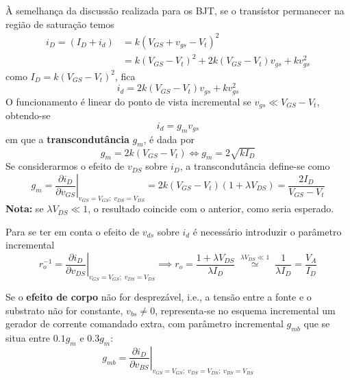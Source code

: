 À semelhança da discussão realizada para os BJT, se o transístor permanecer na região de saturação temos
$$
    \begin{aligned}
        i_D = (I_D + i_d) &= k(V_{GS} + v_{gs} - V_t)^2\\
        &= k(V_{GS} - V_t)^2 + 2k(V_{GS} - V_t) v_{gs} + k v^2_{gs}
    \end{aligned}
$$
\noindent como $I_D = k(V_{GS} - V_t)^2$, fica
$$
    i_d = 2k (V_{GS} - V_t)v_{gs} + k v^2_{gs}
$$
O funcionamento é linear do ponto de vista incremental se $v_{gs} \ll V_{GS} - V_t$, obtendo-se
$$
    i_d = g_m v_{gs}
$$
em que a \textbf{transcondutância} $g_m$, é dada por
$$
    g_m = 2k(V_{GS} - V_t) \iff g_m = 2\sqrt{k I_D}
$$
Se considerarmos o efeito de $v_{DS}$ sobre $i_D$, a transcondutância define-se como
$$
    g_m = \left.\frac{\partial i_D}{\partial v_{GS}}\right|_{v_{GS} = V_{GS};\; v_{DS} = V_{DS}} = 2k(V_{GS} - V_t)(1 + \lambda V_{DS}) = \frac{2 I_D}{V_{GS} - V_t}
$$
\noindent \textbf{Nota:} se $\lambda V_{DS} \ll 1$, o resultado coincide com o anterior, como seria esperado.

\vspace{0.5em}
\noindent Para se ter em conta o efeito de $v_{ds}$ sobre $i_d$ é necessário introduzir o parâmetro incremental
$$
    r^{-1}_o = \left.\frac{\partial i_D}{\partial v_{DS}}\right|_{v_{GS} = V_{GS};\; v_{DS} = V_{DS}} \implies r_o = \frac{1 + \lambda V_{DS}}{\lambda I_D} \;\overset{\scriptstyle \lambda V_{DS} \ll 1}{\simeq}\; \frac{1}{\lambda I_D} = \frac{V_A}{I_D}
$$

\newpage
\noindent Se o \textbf{efeito de corpo} não for desprezável, i.e., a tensão entre a fonte e o substrato não for constante, $v_{bs} \neq 0$, representa-se no esquema incremental um gerador de corrente comandado extra, com parâmetro incremental $g_{mb}$ que se situa entre $0.1 g_m$ e $0.3 g_m$:
$$
    g_{mb} = \left.\frac{\partial i_D}{\partial v_{BS}}\right|_{v_{GS} = V_{GS};\; v_{DS} = V_{DS};\; v_{BS} = V_{BS}}
$$

